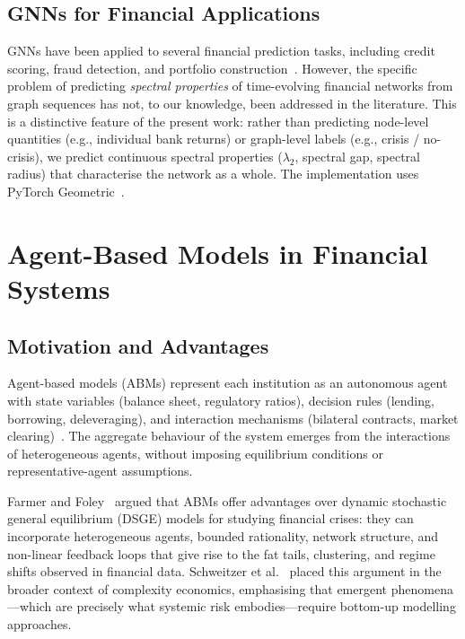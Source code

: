 \subsection{GNNs for Financial Applications}
\label{sec:gnn_finance}

GNNs have been applied to several financial prediction tasks, including
credit scoring, fraud detection, and portfolio
construction~\cite{wu2020comprehensive}.  However, the specific problem
of predicting \emph{spectral properties} of time-evolving financial
networks from graph sequences has not, to our knowledge, been addressed
in the literature.  This is a distinctive feature of the present work:
rather than predicting node-level quantities (e.g., individual bank
returns) or graph-level labels (e.g., crisis / no-crisis), we predict
continuous spectral properties ($\lambda_2$, spectral gap, spectral
radius) that characterise the network as a whole.  The implementation
uses PyTorch Geometric~\cite{fey2019fast}.


\section{Agent-Based Models in Financial Systems}
\label{sec:abm_background}

\subsection{Motivation and Advantages}
\label{sec:abm_motivation}

Agent-based models (ABMs) represent each institution as an autonomous
agent with state variables (balance sheet, regulatory ratios), decision
rules (lending, borrowing, deleveraging), and interaction mechanisms
(bilateral contracts, market clearing)~\cite{tesfatsion2006agent}.  The
aggregate behaviour of the system emerges from the interactions of
heterogeneous agents, without imposing equilibrium conditions or
representative-agent assumptions.

Farmer and Foley~\cite{farmer2009economy} argued that ABMs offer
advantages over dynamic stochastic general equilibrium (DSGE) models
for studying financial crises: they can incorporate heterogeneous agents,
bounded rationality, network structure, and non-linear feedback loops
that give rise to the fat tails, clustering, and regime shifts observed
in financial data.  Schweitzer et al.~\cite{schweitzer2009economic}
placed this argument in the broader context of complexity economics,
emphasising that emergent phenomena---which are precisely what systemic
risk embodies---require bottom-up modelling approaches.

